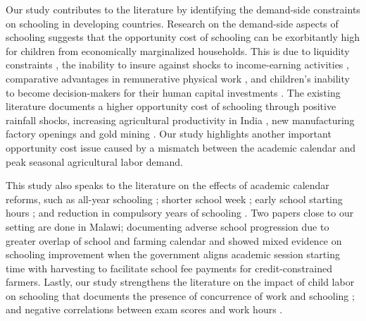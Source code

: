 \documentclass[12pt,letterpaper]{article}
\newcommand{\0}{\ensuremath{\mbox{\boldmath $0$}}}
\begin{document}

Our study contributes to the literature by identifying the demand-side constraints on schooling in developing countries. Research on the demand-side aspects of schooling suggests that the opportunity cost of schooling can be exorbitantly high for children from economically marginalized households. This is due to liquidity constraints  \citep{JacobySkoufias1997, BeegleDehejiaGatti2006}, the inability to insure against shocks to income-earning activities \citep{Jensen2000, deJanvryetal2006, Case2006}, comparative advantages in remunerative physical work \citep{PittRosenzweigHassan2010}, and children’s inability to become decision-makers for their human capital investments \citep{BalandRobinson2000}. The existing literature documents a higher opportunity cost of schooling through positive rainfall shocks, increasing agricultural productivity in India \citep{shah2017drought}, new manufacturing factory openings \citep{atkin2016endogenous} and gold mining \citep{santos2018blessing}. Our study highlights another important opportunity cost issue caused by a mismatch between the academic calendar and peak seasonal agricultural labor demand.

This study also speaks to the literature on the effects of academic calendar reforms, such as all-year schooling \citep{ mcmullen2012impact, graves2010academic}; shorter school week \citep{anderson2015does}; early school starting hours \citep{cortes2012role,  hinrichs2011bell, edwards2012early, carrell2011s}; and reduction in compulsory years of schooling \citep{elsayed2021less}. Two papers close to our setting are done in Malawi; \cite{allen2024double} documenting adverse school progression due to greater overlap of school and farming calendar and \cite{dillon2021selling} showed mixed evidence on schooling improvement when the government aligns academic session starting time with harvesting to facilitate school fee payments for credit-constrained farmers. Lastly, our study strengthens the literature on the impact of child labor on schooling that documents the presence of concurrence of work and schooling \citep{RavallionWodon2000, Edmonds2007, Dumas2012}; and negative correlations between exam scores and work hours \citep{AkabayashiPsacharopoulos1999, Heady2003, Gunnarsson2006}.
\end{document}
